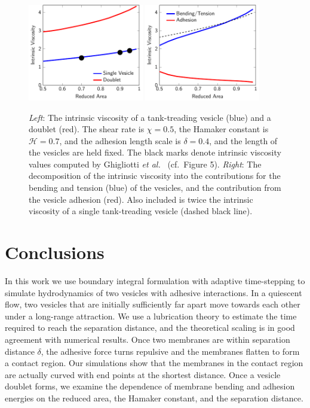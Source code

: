 \documentclass[prf,superscriptaddress,showpacs]{revtex4-1}
\begin{document}
\begin{figure}[htp]
  \centering
  \includegraphics[width=0.45\textwidth]{figs/shear2Ves_adR4em1adS7em1Chi5em1.pdf}
  \includegraphics[width=0.45\textwidth]{figs/doublet_decomp.pdf}
  \caption{\label{fig:shearIntrinsicViscosity} {\em Left}: The intrinsic
  viscosity of a tank-treading vesicle (blue) and a doublet (red).  The
  shear rate is $\chi = 0.5$, the Hamaker constant is $\mathcal{H} =
  0.7$, and the adhesion length scale is $\delta = 0.4$, and the length
  of the vesicles are held fixed.  The black marks denote intrinsic
  viscosity values computed by Ghigliotti {\em et
  al.}~\cite{GhigliottiBibenMisbah2010_JFM} (cf.~Figure 5).  {\em
  Right}: The decomposition of the intrinsic viscosity into the
  contributions for the bending and tension (blue) of the vesicles, and
  the contribution from the vesicle adhesion (red).  Also included is
  twice the intrinsic viscosity of a single tank-treading vesicle
  (dashed black line).}
\end{figure}



\section{Conclusions\label{sec:conclusions}}
In this work we use boundary integral formulation with adaptive
time-stepping to simulate hydrodynamics of two vesicles with adhesive
interactions.  In a quiescent flow, two vesicles that are initially
sufficiently far apart move towards each other under a long-range
attraction.  We use a lubrication theory to estimate the time required
to reach the separation distance, and the theoretical scaling is in good
agreement with numerical results.  Once two membranes are within
separation distance $\delta$, the adhesive force turns repulsive and the
membranes flatten to form a contact region.  Our simulations show that
the membranes in the contact region are actually curved with end points
at the shortest distance.  Once a vesicle doublet forms, we examine the
dependence of membrane bending and adhesion energies on the reduced
area, the Hamaker constant, and the separation distance.
\end{document}
